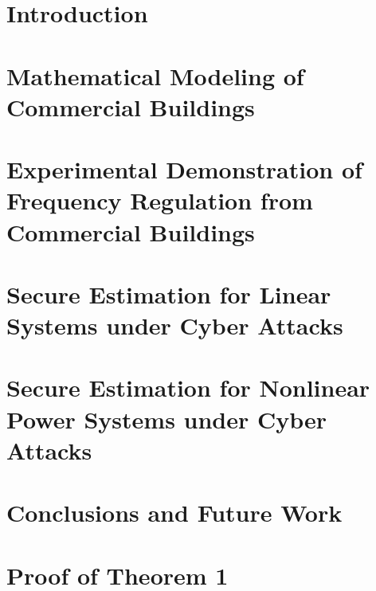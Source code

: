 \documentclass[12pt, oneside, final]{lib/ucthesis}
\def\ssp{\def\baselinestretch{1.0}\large\normalsize}
\begin{document}
\begin{dissertationText}
\chapter{Introduction \label{chapter:intro}}
	
\chapter{Mathematical Modeling of Commercial Buildings \label{chapter:building_model}}
	
\chapter{Experimental Demonstration of Frequency Regulation from Commercial Buildings \label{chapter:building_exp}}
	
\chapter{Secure Estimation for Linear Systems under Cyber Attacks \label{chapter:se_linear}}
	
\chapter{Secure Estimation for Nonlinear Power Systems under Cyber Attacks \label{chapter:se_nonlinear}}
	
\chapter{Conclusions and Future Work \label{chapter:conclusions}}
  



\ssp	%




\appendix
\chapter{Proof of Theorem 1 \label{sec:appendix}}
	

\end{dissertationText}
\end{document}
